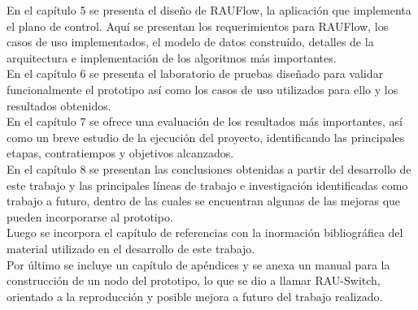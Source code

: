En el cap\'itulo 5 se presenta el diseño de RAUFlow, la aplicaci\'on que implementa el plano de control. Aquí se presentan los requerimientos para RAUFlow, los casos de uso implementados, el modelo de datos constru\'ido, detalles de la arquitectura e implementaci\'on de los algoritmos m\'as importantes.\\

En el cap\'itulo 6 se presenta el laboratorio de pruebas diseñado para validar funcionalmente el prototipo as\'i como los casos de uso utilizados para ello y los resultados obtenidos.\\

En el cap\'itulo 7 se ofrece una evaluación de los resultados m\'as importantes, así como un breve estudio de la ejecuci\'on del proyecto, identificando las principales etapas, contratiempos y objetivos alcanzados.\\

En el cap\'itulo 8 se presentan las conclusiones obtenidas a partir del desarrollo de este trabajo y las principales l\'ineas de trabajo e investigaci\'on identificadas como trabajo a futuro, dentro de las cuales se encuentran algunas de las mejoras que pueden incorporarse al prototipo.\\

Luego se incorpora el cap\'itulo de referencias con la inormaci\'on bibliográfica del material utilizado en el desarrollo de este trabajo.\\

Por \'ultimo se incluye un cap\'itulo de ap\'endices y se anexa un manual para la construcci\'on de un nodo del prototipo, lo que se dio a llamar RAU-Switch, orientado a la reproducci\'on y posible mejora a futuro del trabajo realizado.



 
